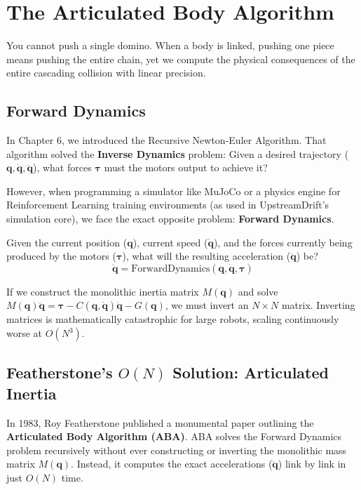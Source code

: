 \chapter{The Articulated Body Algorithm}
\label{ch:articulated_body_algorithm}

\epigraph{%
  You cannot push a single domino. When a body is linked, pushing one piece means pushing the entire chain, yet we compute the physical consequences of the entire cascading collision with linear precision.
}{}

\section{Forward Dynamics}

In Chapter 6, we introduced the Recursive Newton-Euler Algorithm. That algorithm solved the \textbf{Inverse Dynamics} problem: Given a desired trajectory ($\bm{q}, \dot{\bm{q}}, \ddot{\bm{q}}$), what forces $\bm{\tau}$ must the motors output to achieve it?

However, when programming a simulator like MuJoCo or a physics engine for Reinforcement Learning training environments (as used in UpstreamDrift's simulation core), we face the exact opposite problem: \textbf{Forward Dynamics}. 

Given the current position ($\bm{q}$), current speed ($\dot{\bm{q}}$), and the forces currently being produced by the motors ($\bm{\tau}$), what will the resulting acceleration ($\ddot{\bm{q}}$) be?
\begin{equation}
   \ddot{\bm{q}} = \text{ForwardDynamics}(\bm{q}, \dot{\bm{q}}, \bm{\tau})
\end{equation}

If we construct the monolithic inertia matrix $M(\bm{q})$ and solve $M(\bm{q})\ddot{\bm{q}} = \bm{\tau} - C(\bm{q}, \dot{\bm{q}})\dot{\bm{q}} - G(\bm{q})$, we must invert an $N \times N$ matrix. Inverting matrices is mathematically catastrophic for large robots, scaling continuously worse at $O(N^3)$.

\section{Featherstone's $O(N)$ Solution: Articulated Inertia}

In 1983, Roy Featherstone published a monumental paper outlining the \textbf{Articulated Body Algorithm (ABA)}. ABA solves the Forward Dynamics problem recursively without ever constructing or inverting the monolithic mass matrix $M(\bm{q})$. Instead, it computes the exact accelerations ($\ddot{\bm{q}}$) link by link in just $O(N)$ time.

